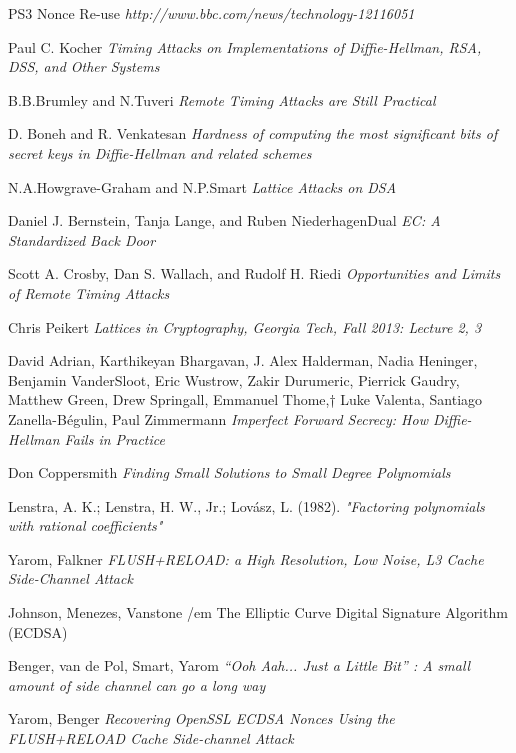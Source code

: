 \documentclass[a4paper,11pt]{article}
\begin{document}
\begin{thebibliography}{1}

 PS3 Nonce Re-use {\em http://www.bbc.com/news/technology-12116051}

 Paul C. Kocher {\em Timing Attacks on Implementations of Diffie-Hellman, RSA, DSS, and Other Systems}

 B.B.Brumley and N.Tuveri {\em Remote Timing Attacks are Still Practical}

 D. Boneh and R. Venkatesan {\em Hardness of computing the most significant bits of secret keys in Diffie-Hellman and related schemes}

 N.A.Howgrave-Graham and N.P.Smart {\em Lattice Attacks on DSA}

 Daniel J. Bernstein, Tanja Lange, and Ruben NiederhagenDual {\em EC: A Standardized Back Door}

 Scott A. Crosby, Dan S. Wallach, and Rudolf H. Riedi {\em Opportunities and Limits of Remote Timing Attacks}

 Chris Peikert {\em Lattices in Cryptography, Georgia Tech, Fall 2013: Lecture 2, 3}

 David Adrian, Karthikeyan Bhargavan, J. Alex Halderman, Nadia Heninger, Benjamin VanderSloot, Eric Wustrow, Zakir Durumeric, Pierrick Gaudry, Matthew Green, Drew Springall, Emmanuel Thome,† Luke Valenta, Santiago Zanella-Bégulin, Paul Zimmermann {\em Imperfect Forward Secrecy: How Diffie-Hellman Fails in Practice}

 Don Coppersmith {\em Finding Small Solutions to Small Degree Polynomials}

 Lenstra, A. K.; Lenstra, H. W., Jr.; Lovász, L. (1982). {\em "Factoring polynomials with rational coefficients"}

 Yarom, Falkner {\em FLUSH+RELOAD: a High Resolution, Low Noise, L3 Cache Side-Channel Attack}

 Johnson, Menezes, Vanstone {/em The Elliptic Curve Digital Signature Algorithm (ECDSA)}

 Benger, van de Pol, Smart, Yarom {\em “Ooh Aah... Just a Little Bit” : A small amount of side channel can go a long way}

 Yarom, Benger {\em Recovering OpenSSL ECDSA Nonces Using the FLUSH+RELOAD Cache Side-channel Attack}


\end{thebibliography}
\end{document}
